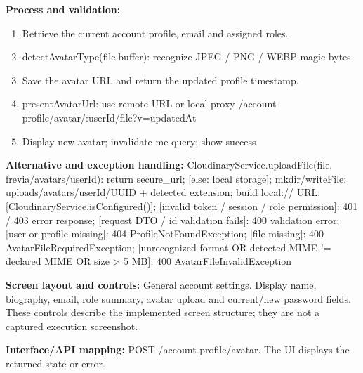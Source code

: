 \textbf{Process and validation:}
\begin{enumerate}
\item Retrieve the current account profile, email and assigned roles.
\item detect\allowbreak{}Avatar\allowbreak{}Type(file.buffer): recognize JPEG /\allowbreak{} PNG /\allowbreak{} WEBP magic bytes
\item Save the avatar URL and return the updated profile timestamp.
\item present\allowbreak{}Avatar\allowbreak{}Url: use remote URL or local proxy /\allowbreak{}account-profile/\allowbreak{}avatar/\allowbreak{}:user\allowbreak{}Id/\allowbreak{}file?v=\allowbreak{}updated\allowbreak{}At
\item Display new avatar; invalidate me query; show success
\end{enumerate}
\textbf{Alternative and exception handling:} Cloudinary\allowbreak{}Service.upload\allowbreak{}File(file, frevia/\allowbreak{}avatars/\allowbreak{}user\allowbreak{}Id): return secure\_url; [else: local storage]; mkdir/\allowbreak{}write\allowbreak{}File: uploads/\allowbreak{}avatars/\allowbreak{}user\allowbreak{}Id/\allowbreak{}UUID + detected extension; build local:/\allowbreak{}/\allowbreak{} URL; [Cloudinary\allowbreak{}Service.is\allowbreak{}Configured()]; [invalid token /\allowbreak{} session /\allowbreak{} role permission]: 401 /\allowbreak{} 403 error response; [request DTO /\allowbreak{} id validation fails]: 400 validation error; [user or profile missing]: 404 Profile\allowbreak{}Not\allowbreak{}Found\allowbreak{}Exception; [file missing]: 400 Avatar\allowbreak{}File\allowbreak{}Required\allowbreak{}Exception; [unrecognized format OR detected MIME !=\allowbreak{} declared MIME OR size > 5 MB]: 400 Avatar\allowbreak{}File\allowbreak{}Invalid\allowbreak{}Exception

\textbf{Screen layout and controls:} General account settings. Display name, biography, email, role summary, avatar upload and current/\allowbreak{}new password fields. These controls describe the implemented screen structure; they are not a captured execution screenshot.

\textbf{Interface/\allowbreak{}API mapping:} POST /\allowbreak{}account-profile/\allowbreak{}avatar. The UI displays the returned state or error.

\endgroup
